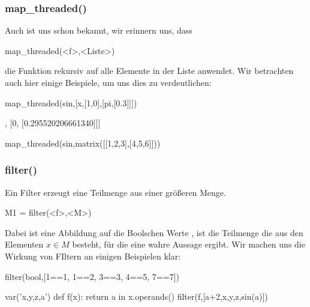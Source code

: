 \documentclass[fontsize=12pt,paper=a4,twoside,bibtotoc,idxtotoc,
liststotoc,pagesize,BCOR1.2cm,DIV15,chapterprefix,pagesize=pdftex]{scrbook}
\theoremstyle{plain}
\theoremstyle{definition}
\theoremstyle{remark}
\begin{document}
\subsubsection{map\_threaded()}
Auch  ist uns schon bekannt, wir erinnern uns, dass
\begin{sagein}
map_threaded(<f>,<Liste>)
\end{sagein}
die Funktion  rekursiv auf alle Elemente in der Liste  anwendet. Wir betrachten auch hier einige Beispiele, um uns dies zu verdeutlichen:
\begin{sagein}
map_threaded(sin,[x,[1,0],[pi,[0.3]]])
\end{sagein}
\begin{sage}
[sin(x), [sin(1), 0], [0, [0.295520206661340]]]
\end{sage}
\begin{sagein}
map_threaded(sin,matrix([[1,2,3],[4,5,6]]))
\end{sagein}
\begin{sage}
\end{sage}
\subsubsection{filter()}
Ein Filter erzeugt eine Teilmenge aus einer größeren Menge.
\begin{sagein}
M1 = filter(<f>,<M>)
\end{sagein}
Dabei ist  eine Abbildung auf die Boolschen Werte ,  ist die Teilmenge die aus den Elementen $x\in M$ besteht, für die  eine wahre Aussage
ergibt. 
Wir machen uns die Wirkung von FIltern an einigen Beispielen klar:
\begin{sagein}
 filter(bool,[1==1, 1==2, 3==3, 4==5, 7==7])
 \end{sagein}
 \begin{sage}
 \end{sage}
\begin{sagein}
var('x,y,z,a')
def f(x): return a in x.operands()
filter(f,[a+2,x,y,z,sin(a)])
\end{sagein}
\begin{sage}
  [a + 2, sin(a)]
\end{sage}
\end{document}

